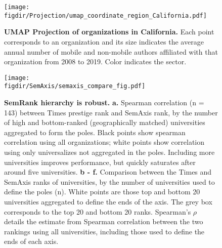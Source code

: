 \documentclass[12pt]{article} %
\def\figdir{../Figs}
\begin{document}
%
%
\begin{figure}[hp!]
	\centering
	\texttt{[image: \\figdir/Projection/umap\_coordinate\_region\_California.pdf]}
	\caption{
		\textbf{UMAP Projection of organizations in California.}
		Each point corresponds to an organization and its size indicates the average annual number of mobile and non-mobile authors affiliated with that organization from 2008 to 2019. 
		Color indicates the sector. 
	}
	\label{fig:supp:proj_california}
\end{figure}




%
%
\begin{figure}[hp!]
	\centering
	\texttt{[image: \\figdir/SemAxis/semaxis\_compare\_fig.pdf]}
	\caption{
		\textbf{SemRank hierarchy is robust.}
		\textbf{a.} Spearman correlation (n = 143) between Times prestige rank and SemAxis rank, by the number of high and bottom-ranked (geographically matched) universities aggregated to form the poles.
		Black points show spearman correlation using all organizations; white points show correlation using only universalizes not aggregated in the poles. 
		Including more universities improves performance, but quickly saturates after around five universities.
		\textbf{b - f.} Comparison between the Times and SemAxis ranks of universities, by the number of universities used to define the poles (n).
		White points are those top and bottom 20 universities aggregated to define the ends of the axis.
		The grey box corresponds to the top 20 and bottom 20 ranks.
	  	Spearman's $\rho$ details the estimate from Spearman correlation between the two rankings using all universities, including those used to define the ends of each axis. 
	}
	\label{fig:supp:semaxis_compare}
\end{figure}



%
%
\end{document}
